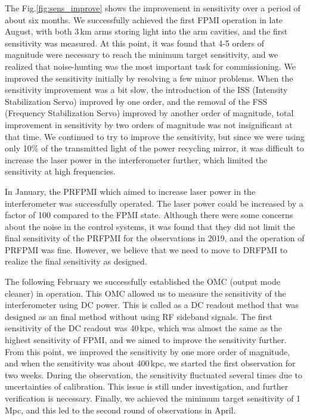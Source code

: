 The Fig.\ref{fig:sens_improve} shows the improvement in sensitivity over a period of about six months. We successfully achieved the first FPMI operation in late August, with both 3\,km arms  storing light into the arm cavities, and the first sensitivity was measured. At this point, it was found that 4-5 orders of magnitude were necessary to reach the minimum target sensitivity, and we realized that noise-hunting was the most important task for commissioning. We improved the sensitivity initially by resolving a few minor problems. When the sensitivity improvement was a bit slow, the introduction of the ISS (Intensity Stabilization Servo) improved by one order, and the removal of the FSS (Frequency Stabilization Servo) improved by another order of magnitude, total improvement in sensitivity by two orders of magnitude was not insignificant at that time. We continued to try to improve the sensitivity, but since we were using only 10\% of the transmitted light of the power recycling mirror, it was difficult to increase the laser power in the interferometer further, which limited the sensitivity at high frequencies.

In January, the PRFPMI which aimed to increase laser power in the interferometer was successfully operated. The laser power could be increased by a factor of 100 compared to the FPMI state. Although there were some concerns about the noise in the control systems, it was found that they did not limit the final sensitivity of the PRFPMI for the observations in 2019, and the operation of PRFPMI was fine. However, we believe that we need to move to DRFPMI to realize the final sensitivity as designed.

The following February we successfully established the OMC (output mode cleaner) in operation. This OMC allowed us to measure the sensitivity of the interferometer using DC power. This is called as a DC readout method that was designed as an final method without using RF sideband signals. The first sensitivity of the DC readout was 40\,kpc, which was almost the same as the highest sensitivity of FPMI, and we aimed to improve the sensitivity further. From this point, we improved the sensitivity by one more order of magnitude, and when the sensitivity was about 400\,kpc, we started the first observation for two weeks. During the observation, the sensitivity fluctuated several times due to uncertainties of calibration. This issue is still under investigation, and further verification is necessary. Finally, we achieved the minimum target sensitivity of 1\,Mpc, and this led to the second round of observations in April.

